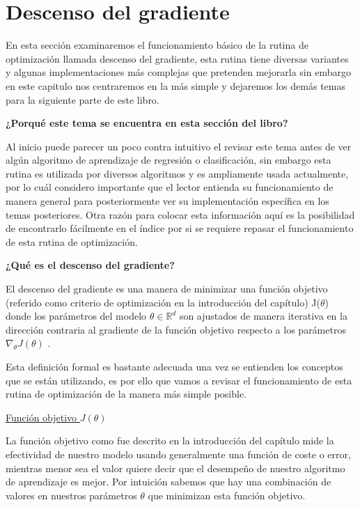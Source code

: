\documentclass[11pt,fleqn]{book} %
\begin{document}
\FloatBarrier
\section{Descenso del gradiente} 

En esta sección examinaremos el funcionamiento básico de la rutina de optimización llamada descenso del gradiente, esta rutina tiene diversas variantes y algunas implementaciones más complejas que pretenden mejorarla sin embargo en este capitulo nos centraremos en la más simple y dejaremos los demás temas para la siguiente parte de este libro.

\textbf{¿Porqué este tema se encuentra en esta sección del libro?}

Al inicio puede parecer un poco contra intuitivo el revisar este tema antes de ver algún algoritmo de aprendizaje de regresión o clasificación, sin embargo esta rutina es utilizada por diversos algoritmos y es ampliamente usada actualmente, por lo cuál considero importante que el lector entienda su funcionamiento de manera general para posteriormente ver su implementación específica en los temas posteriores. Otra razón para colocar esta información aquí es la posibilidad de encontrarlo fácilmente en el índice por si se requiere repasar el funcionamiento de esta rutina de optimización.

\textbf{¿Qué es el descenso del gradiente?}

El descenso del gradiente es una manera de minimizar una función objetivo (referido como criterio de optimización en la introducción del capítulo) J($\theta$) donde los parámetros del modelo $\theta \in \mathbb{R}^{d}$ son ajustados de manera iterativa en la dirección contraria al gradiente de la función objetivo respecto a los parámetros $\nabla _{\theta} J(\theta)$ \cite{ruder2017overview}.

Esta definición formal es bastante adecuada una vez se entienden los conceptos que se están utilizando, es por ello que vamos a revisar el funcionamiento de esta rutina de optimización de la manera más simple posible.

\underline{Función objetivo $J(\theta)$}

La función objetivo como fue descrito en la introducción del capítulo mide la efectividad de nuestro modelo usando generalmente una función de coste o error, mientras menor sea el valor quiere decir que el desempeño de nuestro algoritmo de aprendizaje es mejor. Por intuición sabemos que hay una combinación de valores en nuestros parámetros $\theta$ que minimizan esta función objetivo.
\end{document}
